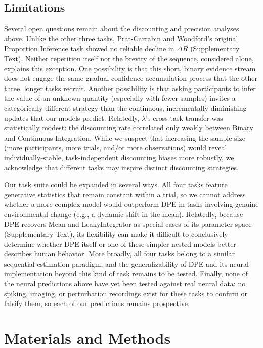 \documentclass[12pt]{article}
\begin{document}
\subsection{Limitations}
Several open questions remain about the discounting and precision analyses above. Unlike the other three tasks, Prat-Carrabin and Woodford's original Proportion Inference task showed no reliable decline in $\Delta R$ (Supplementary Text). Neither repetition itself nor the brevity of the sequence, considered alone, explains this exception. One possibility is that this short, binary evidence stream does not engage the same gradual confidence-accumulation process that the other three, longer tasks recruit. Another possibility is that asking participants to infer the value of an unknown quantity (especially with fewer samples) invites a categorically different strategy than the continuous, incrementally-diminishing updates that our models predict. Relatedly, $\lambda$'s cross-task transfer was statistically modest: the discounting rate correlated only weakly between Binary and Continuous Integration. While we suspect that increasing the sample size (more participants, more trials, and/or more observations) would reveal individually-stable, task-independent discounting biases more robustly, we acknowledge that different tasks may inspire distinct discounting strategies.

Our task suite could be expanded in several ways. All four tasks feature generative statistics that remain constant within a trial, so we cannot address whether a more complex model would outperform DPE in tasks involving genuine environmental change (e.g., a dynamic shift in the mean). Relatedly, because DPE recovers Mean and LeakyIntegrator as special cases of its parameter space (Supplementary Text), its flexibility can make it difficult to conclusively determine whether DPE itself or one of these simpler nested models better describes human behavior. More broadly, all four tasks belong to a similar sequential-estimation paradigm, and the generalizability of DPE and its neural implementation beyond this kind of task remains to be tested.  Finally, none of the neural predictions above have yet been tested against real neural data: no spiking, imaging, or perturbation recordings exist for these tasks to confirm or falsify them, so each of our predictions remains prospective.

\section{Materials and Methods}
\end{document}
